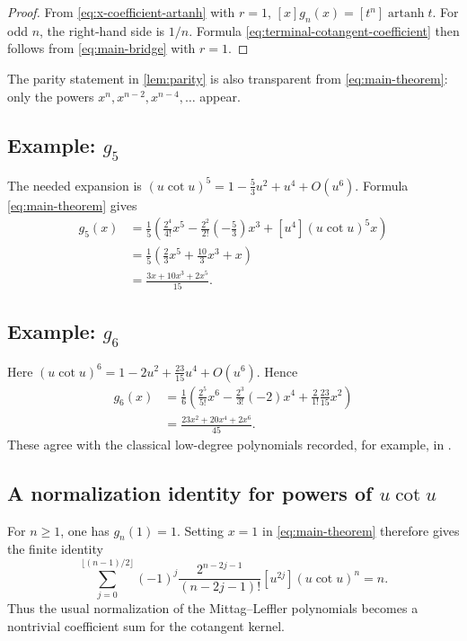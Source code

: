 \documentclass[11pt,twoside]{article}
\begin{document}
\begin{proof}
From \eqref{eq:x-coefficient-artanh} with $r=1$,
\([x]g_n(x)=[t^n]\operatorname{artanh}t\).
For odd $n$, the right-hand side is $1/n$.  Formula
\eqref{eq:terminal-cotangent-coefficient} then follows from
\eqref{eq:main-bridge} with $r=1$.
\end{proof}

The parity statement in \cref{lem:parity} is also transparent from
\eqref{eq:main-theorem}: only the powers
\(x^n,x^{n-2},x^{n-4},\ldots\)
appear.

\subsection{Example: $g_5$}

The needed expansion is
\((u\cot u)^5 =1-\frac53u^2+u^4+O(u^6)\).
Formula \eqref{eq:main-theorem} gives
\begin{align*}
g_5(x)
&=\frac15\left(
\frac{2^4}{4!}x^5
-\frac{2^2}{2!}\left(-\frac53\right)x^3
+[u^4](u\cot u)^5x
\right)\\
&=\frac15\left(\frac23x^5+\frac{10}{3}x^3+x\right)\\
&=\boxed{\frac{3x+10x^3+2x^5}{15}}.
\end{align*}

\subsection{Example: $g_6$}

Here
\((u\cot u)^6 =1-2u^2+\frac{23}{15}u^4+O(u^6)\).
Hence
\begin{align*}
g_6(x)
&=\frac16\left(
\frac{2^5}{5!}x^6
-\frac{2^3}{3!}(-2)x^4
+\frac{2}{1!}\frac{23}{15}x^2
\right)\\
&=\boxed{\frac{23x^2+20x^4+2x^6}{45}}.
\end{align*}
These agree with the classical low-degree polynomials recorded, for
example, in \cite{Bateman1940}.

\subsection{A normalization identity for powers of $u\cot u$}

For $n\ge1$, one has $g_n(1)=1$.  Setting $x=1$ in
\eqref{eq:main-theorem} therefore gives the finite identity
\begin{equation}
\label{eq:normalization-cotangent-sum}
\boxed{
\sum_{j=0}^{\lfloor(n-1)/2\rfloor}
(-1)^j
\frac{2^{n-2j-1}}{(n-2j-1)!}
[u^{2j}](u\cot u)^n
=n.
}
\end{equation}
Thus the usual normalization of the Mittag--Leffler polynomials becomes
a nontrivial coefficient sum for the cotangent kernel.
\end{document}

